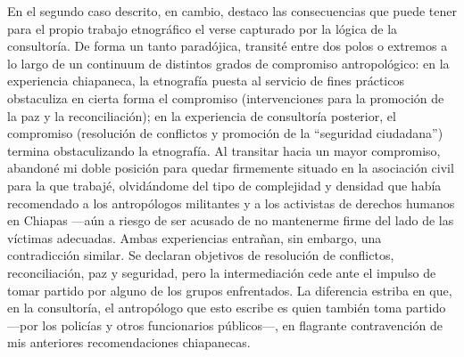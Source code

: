 \documentclass[
  spanish,
  11pt,
  a4paper,
]{scrbook}
\begin{document}
En el segundo caso descrito, en cambio, destaco las consecuencias que
puede tener para el propio trabajo etnográfico el verse capturado por la
lógica de la consultoría. De forma un tanto paradójica, transité entre
dos polos o extremos a lo largo de un continuum de distintos grados de
compromiso antropológico: en la experiencia chiapaneca, la etnografía
puesta al servicio de fines prácticos obstaculiza en cierta forma el
compromiso (intervenciones para la promoción de la paz y la
reconciliación); en la experiencia de consultoría posterior, el
compromiso (resolución de conflictos y promoción de la ``seguridad
ciudadana'') termina obstaculizando la etnografía. Al transitar hacia un
mayor compromiso, abandoné mi doble posición para quedar firmemente
situado en la asociación civil para la que trabajé, olvidándome del tipo
de complejidad y densidad que había recomendado a los antropólogos
militantes y a los activistas de derechos humanos en Chiapas ---aún a
riesgo de ser acusado de no mantenerme firme del lado de las víctimas
adecuadas. Ambas experiencias entrañan, sin embargo, una contradicción
similar. Se declaran objetivos de resolución de conflictos,
reconciliación, paz y seguridad, pero la intermediación cede ante el
impulso de tomar partido por alguno de los grupos enfrentados. La
diferencia estriba en que, en la consultoría, el antropólogo que esto
escribe es quien también toma partido ---por los policías y otros
funcionarios públicos---, en flagrante contravención de mis anteriores
recomendaciones chiapanecas.
\end{document}
